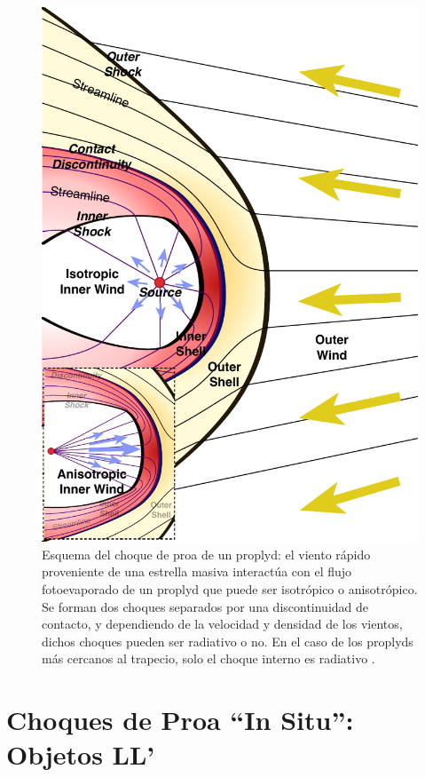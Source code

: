 \begin{figure}
  \centering
  \includegraphics[width=0.7\linewidth]{./Figures/generic-bowshock}
  \caption[Esquema del choque de proa de un proplyd]{Esquema del choque de proa de un proplyd: el viento rápido proveniente de una estrella masiva interactúa con el flujo fotoevaporado de un proplyd que puede ser isotrópico o anisotrópico. Se forman dos choques separados por una discontinuidad de contacto, y dependiendo de la velocidad y densidad de los vientos, dichos choques pueden ser radiativo o no. En el caso de los proplyds más cercanos al trapecio, solo el choque interno es radiativo \citep{Henney:2017}.}
  \label{fig:generic-bowshock}
\end{figure}

\section[Objetos LL]{Choques de Proa ``In Situ'': Objetos LL'}
\label{sec:Luis-LL}

